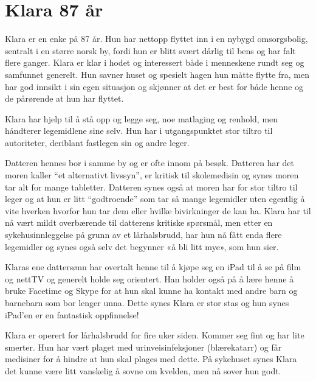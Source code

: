 \chapter{Klara 87 år} \label{chap:klara}
Klara er en enke på 87 år. Hun har nettopp flyttet inn i en nybygd omsorgsbolig, sentralt i en større norsk by, fordi hun er blitt svært dårlig til bens og har falt flere ganger. Klara er klar i hodet og interessert både i menneskene rundt seg og samfunnet generelt. Hun savner huset og spesielt hagen hun måtte flytte fra, men har god innsikt i sin egen situasjon og skjønner at det er best for både henne og de pårørende at hun har flyttet. 

Klara har hjelp til å stå opp og legge seg, noe matlaging og renhold, men håndterer legemidlene sine selv. Hun har i utgangspunktet stor tiltro til autoriteter, deriblant fastlegen sin og andre leger. 

Datteren hennes bor i samme by og er ofte innom på besøk. Datteren har det moren kaller ``et alternativt livssyn'', er kritisk til skolemedisin og synes moren tar alt for mange tabletter. Datteren synes også at moren har for stor tiltro til leger og at hun er litt ``godtroende'' som tar så mange legemidler uten egentlig å vite hverken hvorfor hun tar dem eller hvilke bivirkninger de kan ha. Klara har til nå vært mildt overbærende til datterens kritiske spørsmål, men etter en sykehusinnleggelse på grunn av et lårhalsbrudd, har hun nå fått enda flere legemidler og synes også selv det begynner «å bli litt mye», som hun sier. 

Klaras ene dattersønn har overtalt henne til å kjøpe seg en iPad til å se på film og nettTV og generelt holde seg orientert. Han holder også på å lære henne å bruke Facetime og Skype for at hun skal kunne ha kontakt med andre barn og barnebarn som bor lenger unna. Dette synes Klara er stor stas og hun synes iPad’en er en fantastisk oppfinnelse!

Klara er operert for lårhalsbrudd for fire uker siden. Kommer seg fint og har lite smerter. Hun har vært plaget med urinveisinfeksjoner (blærekatarr) og får medisiner for å hindre at hun skal plages med dette. På sykehuset synes Klara det kunne være litt vanskelig å sovne om kvelden, men nå sover hun godt. 

